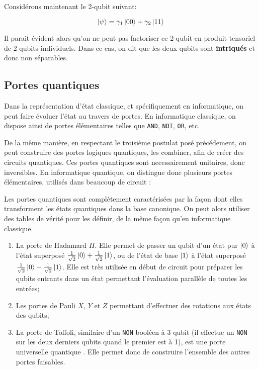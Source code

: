\medbreak

Considérons maintenant le 2-qubit suivant:

\[
\ket{\psi} = \gamma_1 \ket{00} + \gamma_2 \ket{11}
\]

Il parait évident alors qu'on ne peut pas factoriser ce 2-qubit en produit tensoriel de 2 qubits individuels. Dans ce cas, on dit que les deux qubits sont \textbf{intriqués} et donc non séparables.


\subsection{Portes quantiques}
Dans la représentation d'état classique, et spécifiquement en informatique, on peut faire évoluer l'état au travers de portes. En informatique classique, on dispose ainsi de portes élémentaires telles que \texttt{AND}, \texttt{NOT}, \texttt{OR}, etc. 

De la même manière, en respectant le troisième postulat posé précédement, on peut construire des portes logiques quantiques, les combiner, afin de créer des circuits quantiques. Ces portes quantiques sont necessairement unitaires, donc inversibles. En informatique quantique, on distingue donc plusieurs portes élémentaires, utilisés dans beaucoup de circuit \cite{Barenco95}:

Les portes quantiques sont complètement caractérisées par la façon dont elles transforment les états quantiques dans la base canonique. On peut alors utiliser des tables de vérité pour les définir, de la même façon qu'en informatique classique.

\begin{enumerate}
    \item La porte de Hadamard $H$. Elle permet de passer un qubit d'un état pur $\ket{0}$ à l'état superposé $\frac{1}{\sqrt{2}}\ket{0} + \frac{1}{\sqrt{2}}\ket{1}$, ou de l'état de base $\ket{1}$ à l'état superposé $\frac{1}{\sqrt{2}}\ket{0} - \frac{1}{\sqrt{2}}\ket{1}$. Elle est très utilisée en début de circuit pour préparer les qubits entrants dans un état permettant l'évaluation parallèle de toutes les entrées;
    \item Les portes de Pauli $X$, $Y$ et $Z$ permettant d'effectuer des rotations aux états des qubits;
    \item La porte de Toffoli, similaire d'un \texttt{NON} booléen à 3 qubit (il effectue un \texttt{NON} sur les deux derniers qubits quand le premier est à 1), est une porte universelle quantique \cite{shi2002toffoli}. Elle permet donc de construire l'ensemble des autres portes faisables.
\end{enumerate}

